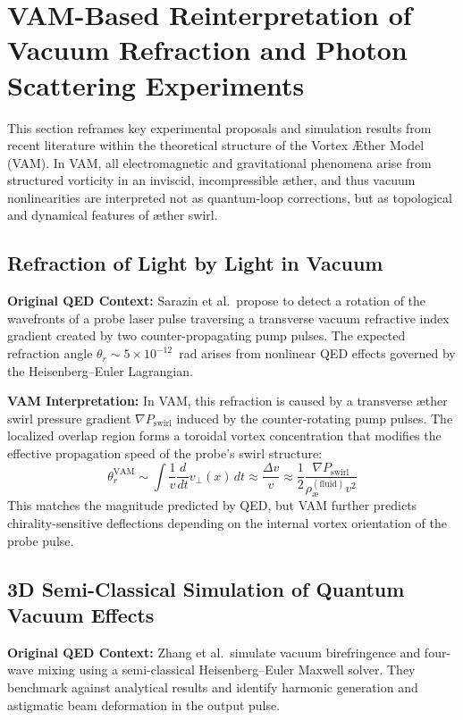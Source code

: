 \section{VAM-Based Reinterpretation of Vacuum Refraction and Photon Scattering Experiments}

This section reframes key experimental proposals and simulation results from recent literature within the theoretical structure of the Vortex \AE{}ther Model (VAM). In VAM, all electromagnetic and gravitational phenomena arise from structured vorticity in an inviscid, incompressible \ae{}ther, and thus vacuum nonlinearities are interpreted not as quantum-loop corrections, but as topological and dynamical features of \ae{}ther swirl.

\subsection{Refraction of Light by Light in Vacuum~\cite{sarazin2016refraction}}

\textbf{Original QED Context:} Sarazin et al.\ propose to detect a rotation of the wavefronts of a probe laser pulse traversing a transverse vacuum refractive index gradient created by two counter-propagating pump pulses. The expected refraction angle $\theta_r \sim 5 \times 10^{-12}$~rad arises from nonlinear QED effects governed by the Heisenberg--Euler Lagrangian.

\textbf{VAM Interpretation:} In VAM, this refraction is caused by a transverse \ae{}ther swirl pressure gradient $\nabla P_\text{swirl}$ induced by the counter-rotating pump pulses. The localized overlap region forms a toroidal vortex concentration that modifies the effective propagation speed of the probe's swirl structure:
\begin{equation}
\theta_r^\text{VAM} \sim \int \frac{1}{v} \frac{d}{dt} v_\perp(x) \, dt \approx \frac{\Delta v}{v} \approx \frac{1}{2} \frac{\nabla P_\text{swirl}}{\rho_\text{\ae}^{(\text{fluid})} v^2}
\end{equation}
This matches the magnitude predicted by QED, but VAM further predicts chirality-sensitive deflections depending on the internal vortex orientation of the probe pulse.

\subsection{3D Semi-Classical Simulation of Quantum Vacuum Effects~\cite{zhang2025computational}}

\textbf{Original QED Context:} Zhang et al.\ simulate vacuum birefringence and four-wave mixing using a semi-classical Heisenberg--Euler Maxwell solver. They benchmark against analytical results and identify harmonic generation and astigmatic beam deformation in the output pulse.

